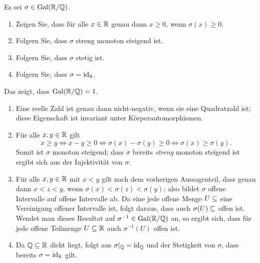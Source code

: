 \begin{question}
  Es sei $\sigma \in \operatorname{Gal}(\mathbb{R}/\mathbb{Q})$.
  \begin{enumerate}
    \item
      Zeigen Sie, dass für alle $x \in \mathbb{R}$ genau dann $x \geq 0$, wenn $\sigma(x) \geq 0$.
    \item
      Folgern Sie, dass $\sigma$ streng monoton steigend ist.
    \item
      Folgern Sie, dass $\sigma$ stetig ist.
    \item
      Folgern Sie, dass $\sigma = \operatorname{id}_{\mathbb{R}}$.
  \end{enumerate}
  Das zeigt, dass $\operatorname{Gal}(\mathbb{R}/\mathbb{Q}) = 1$.
\end{question}


\begin{solution}
  \begin{enumerate}
    \item
      Eine reelle Zahl ist genau dann nicht-negativ, wenn sie eine Quadratzahl ist;
      diese Eigenschaft ist invariant unter Körperautomorphismen.
      
    \item
      Für alle $x, y \in \mathbb{R}$ gilt
      \[
              x \geq y
        \iff  x - y \geq 0
        \iff  \sigma(x) - \sigma(y) \geq 0
        \iff  \sigma(x) \geq \sigma(y).
      \]
      Somit ist $\sigma$ monoton steigend;
      dass $\sigma$ bereits \emph{streng} monoton steigend ist ergibt sich aus der Injektivität von $\sigma$.
      
    \item
      Für alle $x, y \in \mathbb{R}$ mit $x < y$ gilt nach dem vorherigen Aussagenteil, dass genau dann $x < z < y$, wenn 
      $\sigma(x) < \sigma(z) < \sigma(y)$; also bildet $\sigma$ offene Intervalle auf offene Intervalle ab.
      Da eine jede offene Menge $U \subseteq \real$ eine Vereinigung offener Intervalle ist, folgt daraus, dass auch $\sigma(U) \subseteq \real$ offen ist.
      Wendet man dieses Resultat auf $\sigma^{-1} \in \operatorname{Gal}(\mathbb{R}/\mathbb{Q})$ an, so ergibt sich, dass für jede offene Teilmenge $U \subseteq \mathbb{R}$ auch $\sigma^{-1}(U)$ offen ist.
    
    \item
      Da $\mathbb{Q} \subseteq \mathbb{R}$ dicht liegt, folgt aus $\sigma|_{\mathbb{Q}} = \operatorname{id}_{\mathbb{Q}}$ und der Stetigkeit von $\sigma$, dass bereits $\sigma = \operatorname{id}_{\mathbb{R}}$ gilt.
  \end{enumerate}
\end{solution}


